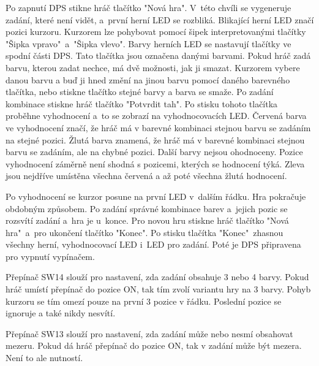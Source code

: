 Po zapnutí DPS stikne hráč tlačítko "Nová hra". V~této chvíli se vygeneruje zadání, které není vidět, a~první herní LED se 
rozbliká. Blikající herní LED značí pozici kurzoru. 
Kurzorem lze pohybovat pomocí šipek interpretovanými tlačítky "Šipka vpravo"\  a~"Šipka vlevo". Barvy herních LED se nastavují 
tlačítky ve spodní části DPS. Tato tlačítka jsou označena danými barvami. Pokud hráč zadá barvu, kterou zadat nechce, má dvě možnosti,
jak ji smazat. Kurzorem vybere danou barvu a buď ji hned změní na jinou barvu pomocí daného barevného tlačítka, nebo stiskne tlačítko 
stejné barvy a barva se smaže. 
Po zadání kombinace stiskne hráč tlačítko "Potvrdit tah". Po stisku tohoto tlačítka proběhne vyhodnocení a~to se zobrazí na 
vyhodnocovacích LED. 
Červená barva ve vyhodnocení značí, že hráč má v barevné kombinaci stejnou barvu se zadáním na stejné pozici. Žlutá barva znamená,
že hráč má v barevné kombinaci stejnou barvu se zadáním, ale na chybné pozici. Další barvy nejsou ohodnoceny. Pozice vyhodnocení
záměrně není shodná s pozicemi, kterých se hodnocení týká. Zleva jsou nejdříve umístěna všechna červená a až poté všechna žlutá 
hodnocení.

Po vyhodnocení se kurzor posune na první LED v~dalším řádku. Hra pokračuje obdobným způsobem.
Po zadání správné kombinace barev a~jejich pozic se rozsvítí zadání a~hra je u~konce. Pro novou hru stiskne hráč tlačítko
"Nová hra"\  a~pro ukončení tlačítko "Konec".
Po stisku tlačítka "Konec"\  zhasnou všechny herní, vyhodnocovací LED i~LED pro zadání. Poté je DPS připravena pro vypnutí
vypínačem.

Přepínač SW14 slouží pro nastavení, zda zadání obsahuje 3 nebo 4 barvy. Pokud hráč umístí přepínač do pozice ON, tak tím 
zvolí variantu hry na 3 barvy. Pohyb kurzoru se tím omezí pouze na první 3 pozice v řádku. Poslední pozice se ignoruje a také nikdy 
nesvítí.

Přepínač SW13 slouží pro nastavení, zda zadání může nebo nesmí obsahovat mezeru. Pokud dá hráč přepínač do pozice ON, 
tak v zadání může být mezera. Není to ale nutností. 


